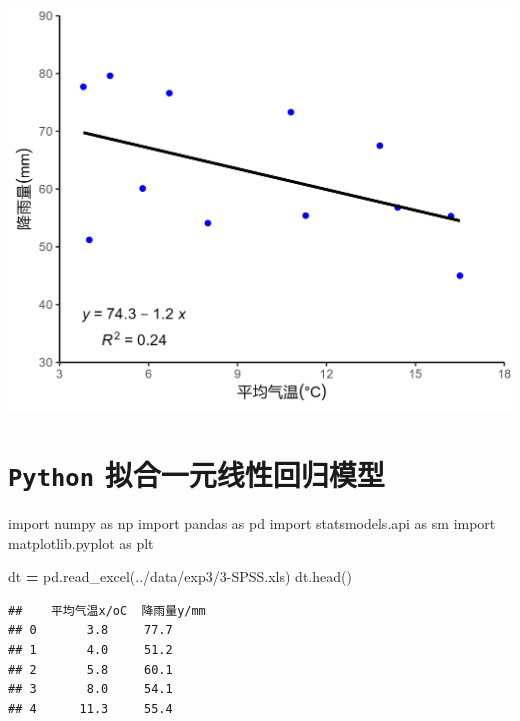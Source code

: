\documentclass[
]{article}
\newenvironment{Shaded}{\begin{snugshade}}{\end{snugshade}}
\newcommand{\ImportTok}[1]{#1}
\newcommand{\NormalTok}[1]{#1}
\newcommand{\OperatorTok}[1]{\textcolor[rgb]{0.81,0.36,0.00}{\textbf{#1}}}
\newcommand{\StringTok}[1]{\textcolor[rgb]{0.31,0.60,0.02}{#1}}
\begin{document}
\begin{center}\includegraphics[width=1\linewidth,height=1\textheight]{exp3_files/figure-latex/lm1.png} \end{center}

\section{\texorpdfstring{\texttt{Python}
拟合一元线性回归模型}{Python 拟合一元线性回归模型}}\label{python-ux62dfux5408ux4e00ux5143ux7ebfux6027ux56deux5f52ux6a21ux578b}

\begin{Shaded}
\begin{Highlighting}[]
\ImportTok{import}\NormalTok{ numpy }\ImportTok{as}\NormalTok{ np}
\ImportTok{import}\NormalTok{ pandas }\ImportTok{as}\NormalTok{ pd}
\ImportTok{import}\NormalTok{ statsmodels.api }\ImportTok{as}\NormalTok{ sm}
\ImportTok{import}\NormalTok{ matplotlib.pyplot }\ImportTok{as}\NormalTok{ plt}

\NormalTok{dt }\OperatorTok{=}\NormalTok{ pd.read\_excel(}\StringTok{\textquotesingle{}../data/exp3/3{-}SPSS.xls\textquotesingle{}}\NormalTok{)}
\NormalTok{dt.head()}
\end{Highlighting}
\end{Shaded}

\begin{verbatim}
##    平均气温x/oC  降雨量y/mm
## 0       3.8     77.7
## 1       4.0     51.2
## 2       5.8     60.1
## 3       8.0     54.1
## 4      11.3     55.4
\end{verbatim}
\end{document}
